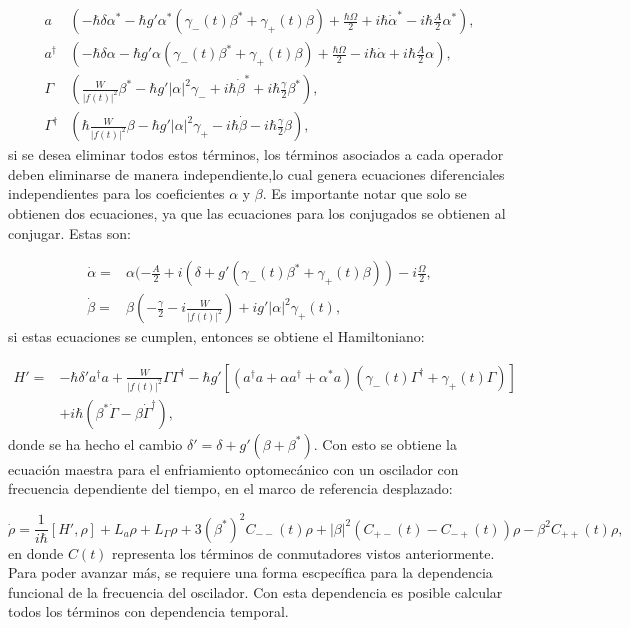 \documentclass[a4paper,10pt]{report}
\begin{document}
\begin{align}
a&(-\hbar\delta\alpha^* -\hbar g' \alpha^*(\gamma_-(t) \beta^* + \gamma_+(t) \beta)+ \frac{\hbar\Omega}{2} + i\hbar\dot{\alpha}^* -i\hbar\frac{A}{2}\alpha^*),\\
a^\dagger&(-\hbar\delta\alpha -\hbar g' \alpha(\gamma_-(t) \beta^* + \gamma_+(t) \beta)+ \frac{\hbar\Omega}{2} - i\hbar\dot{\alpha} +i\hbar\frac{A}{2}\alpha),\\
\Gamma&(\frac{W}{|f(t)|^2}\beta^*-\hbar g'|\alpha|^2\gamma_- +  i\hbar\dot{\beta}^*+i\hbar\frac{\gamma}{2}\beta^*),\\
\Gamma^\dagger&(\hbar\frac{W}{|f(t)|^2}\beta-\hbar g'|\alpha|^2\gamma_+ -  i\hbar\dot{\beta}-i\hbar\frac{\gamma}{2}\beta),
\end{align} si se desea eliminar todos estos términos, los términos asociados a cada operador deben eliminarse de manera independiente,lo cual genera ecuaciones diferenciales independientes para los coeficientes $\alpha$ y $\beta$. Es importante notar que solo se obtienen dos ecuaciones, ya que las ecuaciones para los conjugados se obtienen al conjugar. Estas son:

\begin{align}
\dot{\alpha} =& \alpha(-\frac{A}{2}+i(\delta+g'(\gamma_-(t) \beta^* + \gamma_+(t) \beta))-i\frac{\Omega}{2},\\
\dot{\beta} =& \beta(-\frac{\gamma}{2}-i\frac{W}{|f(t)|^2})+ig'|\alpha|^2\gamma_+(t),
\end{align} si estas ecuaciones se cumplen, entonces se obtiene el Hamiltoniano:


\begin{align*}
H'=& -\hbar \delta' a^\dagger a + \frac{W}{|f(t)|^2}\Gamma \Gamma^\dagger -\hbar g'[(a^{\dagger}a +\alpha a^{\dagger}+\alpha^* a)(\gamma_-(t)\Gamma^{\dagger}+\gamma_+(t)\Gamma)]\\
&+ i\hbar(\beta^*\dot{\Gamma} - \beta \dot{\Gamma}^\dagger),
\end{align*}  donde se ha hecho el cambio $\delta' = \delta + g'(\beta + \beta^*)$. Con esto se obtiene la ecuación maestra para el enfriamiento optomecánico con un oscilador con frecuencia dependiente del tiempo, en el marco de referencia desplazado:

\begin{equation}\label{DLCMasterEquation}
\dot{\rho} = \frac{1}{i\hbar}[H',\rho] + L_a\rho + L_\Gamma\rho + 3(\beta^*)^2C_{--}(t)\rho + |\beta|^2(C_{+-}(t) - C_{-+}(t))\rho -  \beta^2 C_{++}(t)\rho,
\end{equation} en donde $C(t)$ representa los términos de conmutadores vistos anteriormente. Para poder avanzar más, se requiere una forma escpecífica para la dependencia funcional de la frecuencia del oscilador. Con esta dependencia es posible calcular todos los términos con dependencia temporal.
\end{document}
